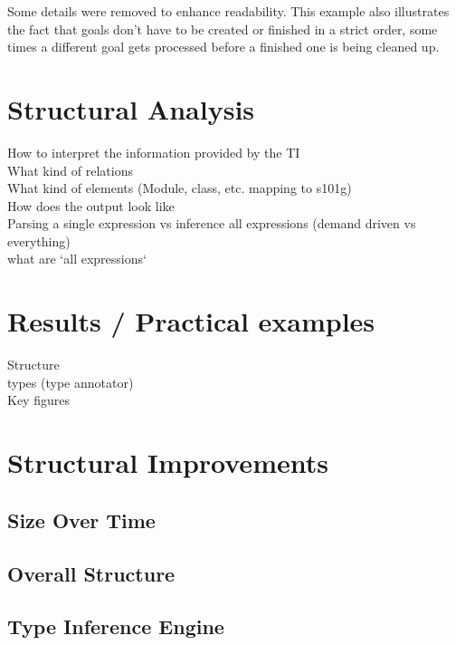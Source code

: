 \documentclass[12pt,halfparskip,DIV11,BCOR10mm]{scrreprt}
\begin{document}
Some details were removed to enhance readability. This example also illustrates the fact that goals don't have to be created or finished in a strict order, some times a different goal gets processed before a finished one is being cleaned up.




\chapter{Structural Analysis}

How to interpret the information provided by the TI \\
What kind of relations \\
What kind of elements (Module, class, etc. mapping to s101g) \\
How does the output look like \\
Parsing a single expression vs inference all expressions (demand driven vs everything)\\
 what are `all expressions`

\chapter{Results / Practical examples}

Structure \\
types (type annotator)\\
Key figures



\chapter{Structural Improvements}
\section{Size Over Time}
\section{Overall Structure}
\section{Type Inference Engine}
\end{document}
